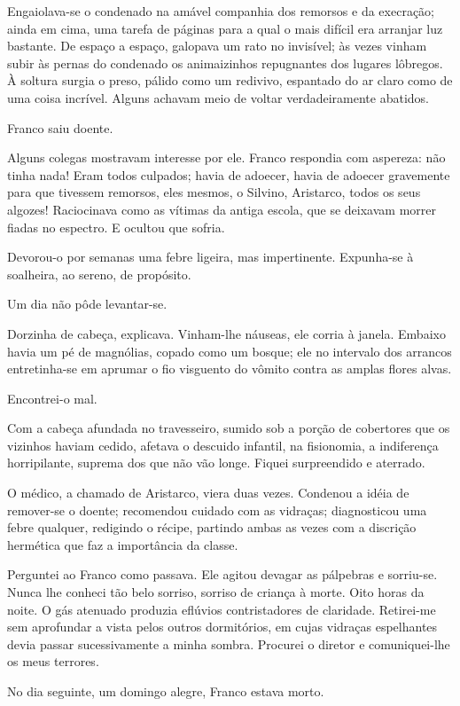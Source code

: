 Engaiolava{}-se o condenado na amável companhia dos remorsos e
da execração; ainda em cima, uma tarefa de páginas para a qual o mais
difícil era arranjar luz bastante. De espaço a espaço, galopava um rato
no invisível; às vezes vinham subir às pernas do condenado os
animaizinhos repugnantes dos lugares lôbregos. À soltura surgia o
preso, pálido como um redivivo, espantado do ar claro como de uma coisa
incrível. Alguns achavam meio de voltar verdadeiramente abatidos.

Franco saiu doente. 

Alguns colegas mostravam interesse por ele. Franco
respondia com aspereza: não tinha nada! Eram todos culpados; havia de
adoecer, havia de adoecer gravemente para que tivessem remorsos, eles
mesmos, o Silvino, Aristarco, todos os seus algozes! Raciocinava como
as vítimas da antiga escola, que se deixavam morrer fiadas no espectro.
E ocultou que sofria. 

Devorou{}-o por semanas uma febre ligeira, mas
impertinente. Expunha{}-se à soalheira, ao sereno, de propósito. 

Um dia não pôde levantar{}-se. 

Dorzinha de cabeça, explicava. Vinham{}-lhe
náuseas, ele corria à janela. Embaixo havia um pé de magnólias, copado
como um bosque; ele no intervalo dos arrancos entretinha{}-se em
aprumar o fio visguento do vômito contra as amplas flores alvas.

Encontrei{}-o mal. 

Com a cabeça afundada no travesseiro, sumido sob a
porção de cobertores que os vizinhos haviam cedido, afetava o descuido
infantil, na fisionomia, a indiferença horripilante, suprema dos que
não vão longe. Fiquei surpreendido e aterrado. 

O médico, a chamado de
Aristarco, viera duas vezes. Condenou a idéia de remover{}-se o doente;
recomendou cuidado com as vidraças; diagnosticou uma febre qualquer,
redigindo o récipe, partindo ambas as vezes com a discrição hermética
que faz a importância da classe. 

Perguntei ao Franco como passava. Ele
agitou devagar as pálpebras e sorriu{}-se. Nunca lhe conheci tão belo
sorriso, sorriso de criança à morte. Oito horas da noite. O gás
atenuado produzia eflúvios contristadores de claridade. Retirei{}-me
sem aprofundar a vista pelos outros dormitórios, em cujas vidraças
espelhantes devia passar sucessivamente a minha sombra. Procurei o
diretor e comuniquei{}-lhe os meus terrores. 

No dia seguinte, um domingo alegre, Franco estava morto. 

